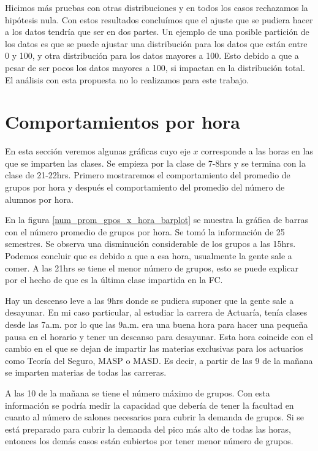 Hicimos más pruebas con otras distribuciones y en todos los casos rechazamos la hipótesis nula. Con estos resultados concluímos que el ajuste que se pudiera hacer a los datos tendría que ser en dos partes. Un ejemplo de una posible partición de los datos es que se puede ajustar una distribución para los datos que están entre 0 y 100, y otra distribución para los datos mayores a 100. Esto debido a que a pesar de ser pocos los datos mayores a 100, si impactan en la distribución total. El análisis con esta propuesta no lo realizamos para este trabajo.


\section{Comportamientos por hora}

En esta sección veremos algunas gráficas cuyo eje $x$ corresponde a las horas en las que se imparten las clases. Se empieza por la clase de 7-8hrs y se termina con la clase de 21-22hrs. Primero mostraremos el comportamiento del promedio de grupos por hora y después el comportamiento del promedio del número de alumnos por hora.

En la figura \ref{num_prom_gpos_x_hora_barplot} se muestra la gráfica de barras con el número promedio de grupos por hora. Se tomó la información de 25 semestres. Se observa una disminución considerable de los grupos a las 15hrs. Podemos concluir que es debido a que a esa hora, usualmente la gente sale a comer. A las 21hrs se tiene el menor número de grupos, esto se puede explicar por el hecho de que es la última clase impartida en la FC.

Hay un descenso leve a las 9hrs donde se pudiera suponer que la gente sale a desayunar. En mi caso particular, al estudiar la carrera de Actuaría, tenía clases desde las 7a.m. por lo que las 9a.m. era una buena hora para hacer una pequeña pausa en el horario y tener un descanso para desayunar. Esta hora coincide con el cambio en el que se dejan de impartir las materias exclusivas para los actuarios como Teoría del Seguro, MASP o MASD. Es decir, a partir de las 9 de la mañana se imparten materias de todas las carreras.

A las 10 de la mañana se tiene el número máximo de grupos. Con esta información se podría medir la capacidad que debería de tener la facultad en cuanto al número de salones necesarios para cubrir la demanda de grupos. Si se está preparado para cubrir la demanda del pico más alto de todas las horas, entonces los demás casos están cubiertos por tener menor número de grupos.


